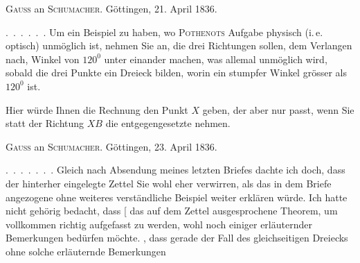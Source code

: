 
\begin{center}
\textsc{Gauss} an \textsc{Schumacher}. Göttingen, 21. April 1836.
\end{center}

\indent \mbox{. . . . . .} Um ein Beispiel zu haben, wo \textsc{Pothenots}
Aufgabe physisch (i.\,e. optisch) unmöglich ist, nehmen Sie an, die drei
Richtungen sollen, dem Verlangen nach, Winkel von $120^0$ unter einander
machen, was allemal unmöglich wird, sobald die drei Punkte ein Dreieck
bilden, worin ein stumpfer Winkel grösser als $120^0$ ist.

\begin{center}\end{center}

Hier würde Ihnen die Rechnung den Punkt $X$ geben, der aber nur
passt, wenn Sie statt der Richtung $XB$ die entgegengesetzte
nehmen.

\begin{center}
\textsc{Gauss} an \textsc{Schumacher}. Göttingen, 23. April 1836.
\end{center}

\indent \mbox{. . . . . . .} Gleich nach Absendung meines letzten Briefes
dachte ich doch, dass der hinterher eingelegte Zettel Sie wohl eher
verwirren, als das in dem Briefe angezogene ohne weiteres verständliche
Beispiel weiter erklären würde. Ich hatte nicht gehörig bedacht, dass
[ das  auf dem Zettel ausgesprochene Theorem, um
vollkommen richtig aufgefasst zu werden, wohl noch einiger erläuternder
Bemerkungen bedürfen möchte. , dass gerade der Fall des
gleichseitigen Dreiecks ohne solche erläuternde Bemerkungen
